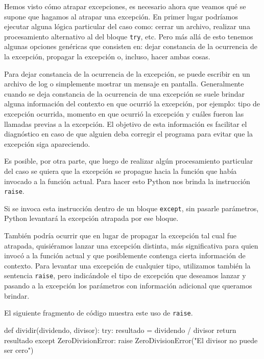 Hemos visto cómo atrapar excepciones, es necesario ahora que veamos qué se
supone que hagamos al atrapar una excepción. En primer lugar podríamos
ejecutar alguna lógica particular del caso como: cerrar un archivo,
realizar una procesamiento alternativo al del bloque \lstinline!try!, etc.
Pero más allá de esto tenemos algunas opciones genéricas que consisten en:
dejar constancia de la ocurrencia de la excepción, propagar la excepción o,
incluso, hacer ambas cosas.

Para dejar constancia de la ocurrencia de la excepción, se puede escribir
en un archivo de log o simplemente mostrar un mensaje en pantalla.
Generalmente cuando se deja constancia de la ocurrencia de una excepción se
suele brindar alguna información del contexto en que ocurrió la excepción,
por ejemplo: tipo de excepción ocurrida, momento en que ocurrió la
excepción y cuáles fueron las llamadas previas a la excepción. El objetivo
de esta información es facilitar el diagnóstico en caso de que alguien deba
corregir el programa para evitar que la excepción siga apareciendo.

Es posible, por otra parte, que luego de realizar algún procesamiento
particular del caso se quiera que la excepción se propague hacia la función
que había invocado a la función actual. Para hacer esto Python nos brinda
la instrucción \lstinline!raise!.

Si se invoca esta instrucción dentro de un bloque \lstinline!except!, sin
pasarle parámetros, Python levantará la excepción atrapada por ese bloque.

También podría ocurrir que en lugar de propagar la excepción tal cual fue
atrapada, quisiéramos lanzar una excepción distinta, más significativa para
quien invocó a la función actual y que posiblemente contenga cierta
información de contexto. Para levantar una excepción de cualquier tipo,
utilizamos también la sentencia \lstinline!raise!, pero indicándole el tipo
de excepción que deseamos lanzar y pasando a la excepción los parámetros
con información adicional que queramos brindar.

El siguiente fragmento de código muestra este uso de \lstinline!raise!.

\begin{codigo-python-sn}
def dividir(dividendo, divisor):
	try:
		resultado = dividendo / divisor
		return resultado
	except ZeroDivisionError:
		raise ZeroDivisionError("El divisor no puede ser cero")
\end{codigo-python-sn}

